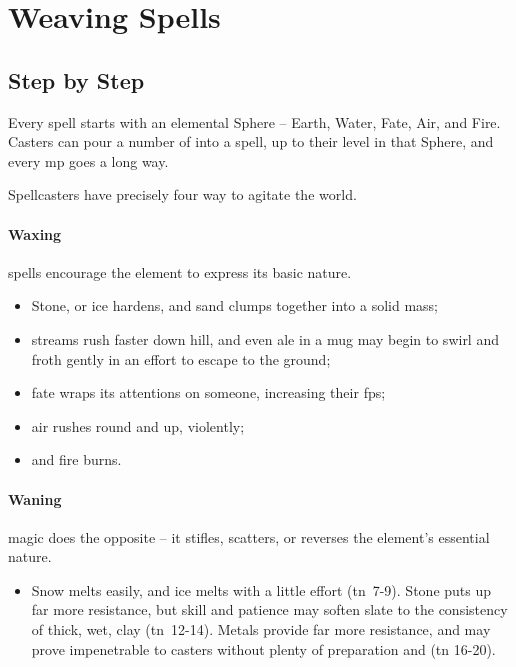 \section{Weaving Spells}

\begin{multicols}{2}

\subsection{Step by Step}


Every spell starts with an elemental Sphere -- Earth, Water, Fate, Air, and Fire.
Casters can pour a number of  into a spell, up to their level in that Sphere, and every \gls{mp} goes a long way.

Spellcasters have precisely four way to agitate the world.

\paragraph{Waxing}
spells encourage the element to express its basic nature.

\begin{itemize}
  \item
  Stone, or ice hardens, and sand clumps together into a solid mass;
  \item
  streams rush faster down hill, and even ale in a mug may begin to swirl and froth gently in an effort to escape to the ground;
  \item
  fate wraps its attentions on someone, increasing their \glspl{fp};
  \item
  air rushes round and up, violently;
  \item
  and fire burns.
\end{itemize}

\paragraph{Waning}
magic does the opposite -- it stifles, scatters, or reverses the element's essential nature.

\begin{itemize}
  \item
  Snow melts easily, and ice melts with a little effort (\gls{tn}~7-9).
  Stone puts up far more resistance, but skill and patience may soften slate to the consistency of thick, wet, clay (\gls{tn}~12-14).
  Metals provide far more resistance, and may prove impenetrable to casters without plenty of preparation and  (\gls{tn} 16-20).


\end{itemize}
\end{multicols}
